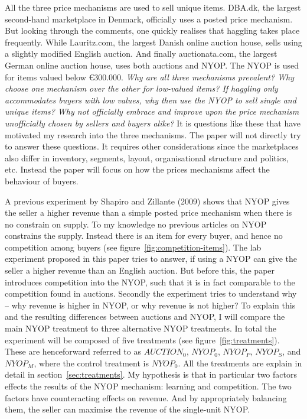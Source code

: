 \documentclass[a4paper,12pt]{article}
\begin{document}
	All the three price mechanisms are used to sell unique items. DBA.dk, the largest second-hand marketplace in Denmark, officially uses a posted price mechanism. But looking through the comments, one quickly realises that haggling takes place frequently. While Lauritz.com, the largest Danish online auction house, sells using a slightly modified English auction. And finally auctionata.com, the largest German online auction house, uses both auctions and NYOP. The NYOP is used for items valued below \euro300.000. \emph{Why are all three mechanisms prevalent? Why choose one mechanism over the other for low-valued items? If haggling only accommodates buyers with low values, why then use the NYOP to sell single and unique items? Why not officially embrace and improve upon the price mechanism unofficially chosen by sellers and buyers alike?} It is questions like these that have motivated my research into the three mechanisms. The paper will not directly try to answer these questions. It requires other considerations since the marketplaces also differ in inventory, segments, layout, organisational structure and politics, etc. Instead the paper will focus on how the prices mechanisms affect the behaviour of buyers.
	
	A previous experiment by Shapiro and Zillante (2009) shows that NYOP gives the seller a higher revenue than a simple posted price mechanism when there is no constrain on supply. To my knowledge no previous articles on NYOP constrains the supply. Instead there is an item for every buyer, and hence no competition among buyers (see figure~\ref{fig:competition-items}). The lab experiment proposed in this paper tries to answer, if using a NYOP can give the seller a higher revenue than an English auction. But before this, the paper introduces competition into the NYOP, such that it is in fact comparable to the competition found in auctions.  Secondly the experiment tries to understand why -- why revenue is higher in NYOP, or why revenue is not higher? To explain this and the resulting differences between auctions and NYOP, I will compare the main NYOP treatment to three alternative NYOP treatments. In total the experiment will be composed of five treatments (see figure~\ref{fig:treatments}). These are henceforward referred to as $AUCTION_0$, $NYOP_0$, $NYOP_P$, $NYOP_S$, and $NYOP_M$, where the control treatment is $NYOP_0$. All the treatments are explain in detail in section~\ref{sec:treatments}. My hypothesis is that in particular two factors effects the results of the NYOP mechanism: learning and competition. The two factors have counteracting effects on revenue. And by appropriately balancing them, the seller can maximise the revenue of the single-unit NYOP. 
\end{document}

